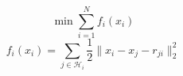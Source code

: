 \documentclass[letterpaper, 10 pt, conference]{ieeeconf}  %
\begin{document}


\begin{equation}\label{eq:min}
    \min \sum_{i=1}^{N} f_{i} (x_{i})
\end{equation}
\begin{equation}\label{eq:f_i}
    f_{i}(x_{i}) = \sum_{j \in \mathcal{H}_{i}} \frac{1}{2} \|x_{i} - x_{j} - r_{ji}\|_{2}^{2}
\end{equation}



\end{document}

